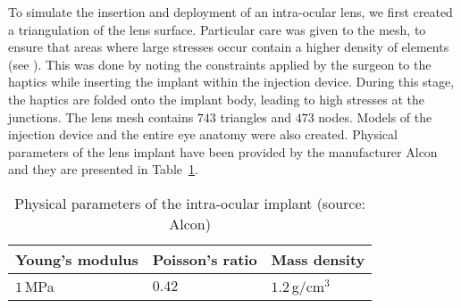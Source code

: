 To simulate the insertion and deployment of an intra-ocular lens, we first created a triangulation of the lens surface. Particular care was given to the mesh, to ensure that areas where large stresses occur contain a higher density of elements (see ). This was done by noting the constraints applied by the surgeon to the haptics while inserting the implant within the injection device. During this stage, the haptics are folded onto the implant body, leading to high stresses at the junctions. The lens mesh contains $743$ triangles and $473$ nodes. Models of the injection device and the entire eye anatomy were also created. Physical parameters of the lens implant have been provided by the manufacturer Alcon and they are presented in Table~\ref{chap9:tab-parameters}.
%
\begin{table}[h!]
	\begin{center}
		\begin{tabular}{|p{3cm}|p{3cm}|p{3cm}|}
		\hline
		 \centering Young's modulus & \centering Poisson's ratio & \centering Mass density \tabularnewline
		\hline
		\centering $1\,$MPa & \centering $0.42$ & \centering $1.2\,$g/cm$^3$ \tabularnewline
		\hline
		\end{tabular}
	\vspace{0.3cm}
	\caption{Physical parameters of the intra-ocular implant (source: Alcon)}
	\label{chap9:tab-parameters}
	\end{center}
\end{table}

